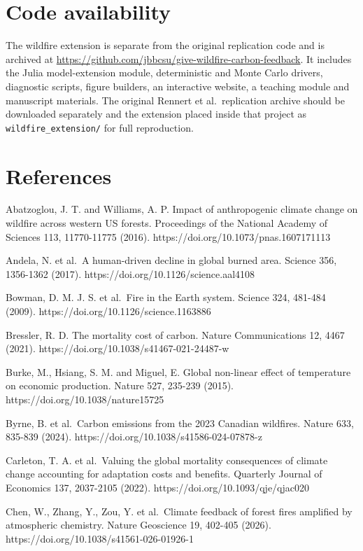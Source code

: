\documentclass[12pt]{article}
\begin{document}
\section{Code availability}\label{code-availability}

The wildfire extension is separate from the original replication code
and is archived at
\url{https://github.com/jbbcsu/give-wildfire-carbon-feedback}. It
includes the Julia model-extension module, deterministic and Monte Carlo
drivers, diagnostic scripts, figure builders, an interactive website, a
teaching module and manuscript materials. The original Rennert et
al.~replication archive should be downloaded separately and the
extension placed inside that project as \texttt{wildfire\_extension/}
for full reproduction.

\section{References}\label{references}

Abatzoglou, J. T. and Williams, A. P. Impact of anthropogenic climate
change on wildfire across western US forests. Proceedings of the
National Academy of Sciences 113, 11770-11775 (2016).
https://doi.org/10.1073/pnas.1607171113

Andela, N. et al.~A human-driven decline in global burned area. Science
356, 1356-1362 (2017). https://doi.org/10.1126/science.aal4108

Bowman, D. M. J. S. et al.~Fire in the Earth system. Science 324,
481-484 (2009). https://doi.org/10.1126/science.1163886

Bressler, R. D. The mortality cost of carbon. Nature Communications 12,
4467 (2021). https://doi.org/10.1038/s41467-021-24487-w

Burke, M., Hsiang, S. M. and Miguel, E. Global non-linear effect of
temperature on economic production. Nature 527, 235-239 (2015).
https://doi.org/10.1038/nature15725

Byrne, B. et al.~Carbon emissions from the 2023 Canadian wildfires.
Nature 633, 835-839 (2024). https://doi.org/10.1038/s41586-024-07878-z

Carleton, T. A. et al.~Valuing the global mortality consequences of
climate change accounting for adaptation costs and benefits. Quarterly
Journal of Economics 137, 2037-2105 (2022).
https://doi.org/10.1093/qje/qjac020

Chen, W., Zhang, Y., Zou, Y. et al.~Climate feedback of forest fires
amplified by atmospheric chemistry. Nature Geoscience 19, 402-405
(2026). https://doi.org/10.1038/s41561-026-01926-1
\end{document}
